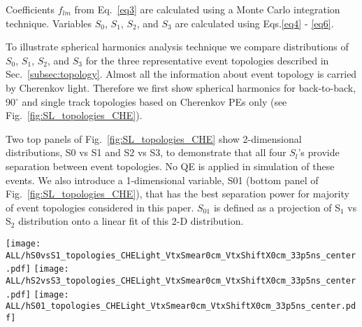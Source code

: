 Coefficients $f_{lm}$ from Eq.~\ref{eq3} are calculated using a Monte Carlo integration technique. Variables $S_0$, $S_1$, $S_2$, and $S_3$ are calculated using Eqs.\ref{eq4} - \ref{eq6}.

To illustrate spherical harmonics analysis technique we compare distributions of $S_0$, $S_1$, $S_2$, and $S_3$ for the three representative event topologies described in Sec.~\ref{subsec:topology}. Almost all the information about event topology is carried by Cherenkov light. Therefore we first show spherical harmonics for back-to-back,  90$^{\circ}$ and single track topologies based on Cherenkov PEs only (see Fig.~\ref{fig:SL_topologies_CHE}).

Two top panels of Fig.~\ref{fig:SL_topologies_CHE} show 2-dimensional distributions, S0 vs S1 and S2 vs S3, to demonstrate that all four $S_l$'s provide separation between event topologies. No QE is applied in simulation of these events. We also introduce a 1-dimensional variable, S01 (bottom panel of Fig.~\ref{fig:SL_topologies_CHE}), that has the best separation power for majority of event topologies considered in this paper. $S_{01}$ is defined as a projection of S$_1$ vs S$_2$ distribution onto a linear fit of this 2-D distribution.

\begin{figure*}[h]
  \centering
  \texttt{[image: ALL/hS0vsS1\_topologies\_CHELight\_VtxSmear0cm\_VtxShiftX0cm\_33p5ns\_center.pdf]}
  \texttt{[image: ALL/hS2vsS3\_topologies\_CHELight\_VtxSmear0cm\_VtxShiftX0cm\_33p5ns\_center.pdf]}
  \texttt{[image: ALL/hS01\_topologies\_CHELight\_VtxSmear0cm\_VtxShiftX0cm\_33p5ns\_center.pdf]}
  \caption{Spherical harmonics for three event topologies: two
    back-to-back 1.26~MeV electrons (\emph{black squares and black
      dotted line}), two 1.26~MeV electrons at 90$^{\circ}$ angle
    (\emph{blue triangles and blue dashed line}), and a single
    2.529~MeV electron representing $^{8}$B background (\emph{red
      crosses and red solid line}). Simulation of 1000 events
    originated at the center of the sphere. Perfect separation between
    Cherenkov and scintillation light is implemented in this
    simulation by using only Cherenkov photons. \emph{Top left:} $S_0$
    versus $S_1$ scatter plot. Black dotted line is a linear fit of
    the 90$^{\circ}$ topology and $^{8}$B events. Variable $S_{01}$ is
    defined as a projection of 2D distribution onto this linear
    fit. \emph{Top right:} $S_2$ versus $S_3$ scatter
    plot. \emph{Bottom:} $S_{01}$ distributions for the three
    topologies. These distributions are normalized to unit area for
    shape comparison.}
  \label{fig:SL_topologies_CHE}
\end{figure*}


